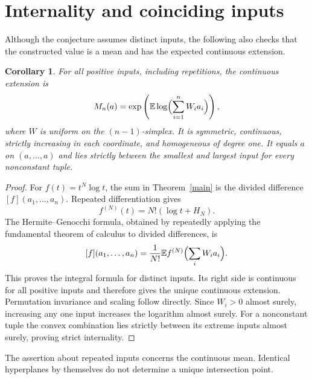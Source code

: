 \documentclass[11pt]{article}
\newtheorem{corollary}{Corollary}
\begin{document}
\section{Internality and coinciding inputs}
Although the conjecture assumes distinct inputs, the following also checks
that the constructed value is a mean and has the expected continuous extension.
\begin{corollary}\label{internal}
For all positive inputs, including repetitions, the continuous extension is
\[
 M_n(a)=\exp\left(\mathbb E\log\Bigl(\sum_{i=1}^n W_i a_i\Bigr)\right),
\]
where $W$ is uniform on the $(n-1)$-simplex. It is symmetric, continuous,
strictly increasing in each coordinate, and homogeneous of degree one.
It equals $a$ on $(a,\ldots,a)$ and lies strictly between the smallest
and largest input for every nonconstant tuple.
\end{corollary}
\begin{proof}
For $f(t)=t^N\log t$, the sum in Theorem~\ref{main} is the divided
difference $[f](a_1,\ldots,a_n)$. Repeated differentiation gives
\[
 f^{(N)}(t)=N!(\log t+H_N).
\]
The Hermite--Genocchi formula, obtained by repeatedly applying the fundamental
theorem of calculus to divided differences, is
\[
 [f](a_1,\ldots,a_n)=\frac1{N!}
 \mathbb E f^{(N)}\Bigl(\sum_iW_i a_i\Bigr).
\]
This proves the integral formula for distinct inputs. Its right side is
continuous for all positive inputs and therefore gives the unique continuous
extension. Permutation invariance and scaling follow directly. Since
$W_i>0$ almost surely, increasing any one input increases the logarithm
almost surely. For a nonconstant tuple the convex combination lies strictly
between its extreme inputs almost surely, proving strict internality.
\end{proof}
The assertion about repeated inputs concerns the continuous mean. Identical
hyperplanes by themselves do not determine a unique intersection point.
\end{document}
